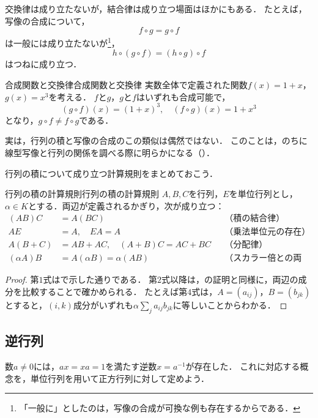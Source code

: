 交換律は成り立たないが，結合律は成り立つ場面はほかにもある．
たとえば，写像の合成について，
\[
  f \circ g = g \circ f
\]
は一般には成り立たないが\footnote{「一般に」としたのは，写像の合成が可換な例も存在するからである．}，
\[
  h \circ (g \circ f) = (h \circ g) \circ f
\]
はつねに成り立つ．

\begin{example}{合成関数と交換律}{合成関数と交換律}
  実数全体で定義された関数$f(x) = 1 + x$，$g(x) = x^3$を考える．
  $f$と$g$，$g$と$f$はいずれも合成可能で，
  \[
    (g \circ f)(x) = (1 + x)^3, \quad (f \circ g)(x) = 1 + x^3
  \]
  となり，$g \circ f \ne f \circ g$である．
\end{example}

実は，行列の積と写像の合成のこの類似は偶然ではない．
このことは，のちに線型写像と行列の関係を調べる際に明らかになる（）．

行列の積について成り立つ計算規則をまとめておこう．

\begin{prop}{行列の積の計算規則}{行列の積の計算規則}
  $A,B,C$を行列，$E$を単位行列とし，$\alpha \in K$とする．両辺が定義されるかぎり，次が成り立つ：
  \begin{align*}
    (AB)C &= A(BC) && \text{（積の結合律）} \\
    AE &= A, \quad EA = A && \text{（乗法単位元の存在）} \\
    A(B + C) &= AB + AC, \quad (A + B)C = AC + BC && \text{（分配律）} \\
    (\alpha A)B &= A(\alpha B) = \alpha(AB) && \text{（スカラー倍との両立）}
  \end{align*}
\end{prop}

\begin{tleftbar}
\begin{proof}
  第$1$式はで示した通りである．
  第$2$式以降は，の証明と同様に，両辺の成分を比較することで確かめられる．
  たとえば第$4$式は，$A = (a_{ij})$，$B = (b_{jk})$とすると，$(i, k)$成分がいずれも$\alpha \sum_{j} a_{ij} b_{jk}$に等しいことからわかる．
\end{proof}
\end{tleftbar}

\subsection{逆行列}

数$a\ne0$には，$ax=xa=1$を満たす逆数$x=a^{-1}$が存在した．
これに対応する概念を，単位行列を用いて正方行列に対して定めよう．

